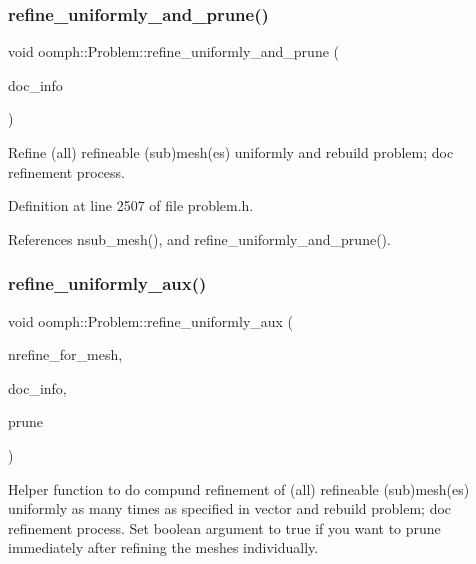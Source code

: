 \subsubsection{\texorpdfstring{refine\+\_\+uniformly\+\_\+and\+\_\+prune()}{refine\_uniformly\_and\_prune()}\hspace{0.1cm}{\footnotesize\ttfamily [3/3]}}
{\footnotesize\ttfamily void oomph\+::\+Problem\+::refine\+\_\+uniformly\+\_\+and\+\_\+prune (\begin{DoxyParamCaption}\item[{\hyperlink{classoomph_1_1DocInfo}{Doc\+Info} \&}]{doc\+\_\+info }\end{DoxyParamCaption})\hspace{0.3cm}{\ttfamily [inline]}}



Refine (all) refineable (sub)mesh(es) uniformly and rebuild problem; doc refinement process. 



Definition at line 2507 of file problem.\+h.



References nsub\+\_\+mesh(), and refine\+\_\+uniformly\+\_\+and\+\_\+prune().

\mbox{\label{classoomph_1_1Problem_a0f86f3d5d65115dca81e10910e11ea19}} 
\subsubsection{\texorpdfstring{refine\+\_\+uniformly\+\_\+aux()}{refine\_uniformly\_aux()}}
{\footnotesize\ttfamily void oomph\+::\+Problem\+::refine\+\_\+uniformly\+\_\+aux (\begin{DoxyParamCaption}\item[{const \hyperlink{classoomph_1_1Vector}{Vector}$<$ unsigned $>$ \&}]{nrefine\+\_\+for\+\_\+mesh,  }\item[{\hyperlink{classoomph_1_1DocInfo}{Doc\+Info} \&}]{doc\+\_\+info,  }\item[{const bool \&}]{prune }\end{DoxyParamCaption})\hspace{0.3cm}{\ttfamily [private]}}



Helper function to do compund refinement of (all) refineable (sub)mesh(es) uniformly as many times as specified in vector and rebuild problem; doc refinement process. Set boolean argument to true if you want to prune immediately after refining the meshes individually. 

